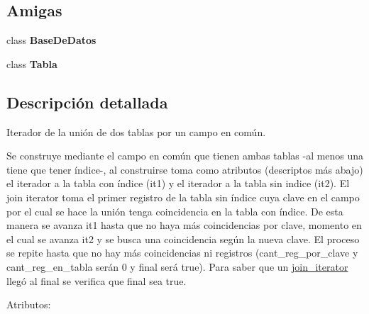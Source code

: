 \subsection*{Amigas}
\begin{DoxyCompactItemize}
\item 
\mbox{\label{classBaseDeDatos_1_1join__iterator_af1e840dbc460e53fa421d03b2da138e4}} 
class {\bfseries Base\+De\+Datos}
\item 
\mbox{\label{classBaseDeDatos_1_1join__iterator_a172484163cb8b80140c3053a4c68e4da}} 
class {\bfseries Tabla}
\end{DoxyCompactItemize}


\subsection{Descripción detallada}
Iterador de la unión de dos tablas por un campo en común. 

Se construye mediante el campo en común que tienen ambas tablas -\/al menos una tiene que tener índice-\/, al construirse toma como atributos (descriptos más abajo) el iterador a la tabla con índice (it1) y el iterador a la tabla sin indice (it2). El join iterator toma el primer registro de la tabla sin índice cuya clave en el campo por el cual se hace la unión tenga coincidencia en la tabla con índice. De esta manera se avanza it1 hasta que no haya más coincidencias por clave, momento en el cual se avanza it2 y se busca una coincidencia según la nueva clave. El proceso se repite hasta que no hay más coincidencias ni registros (cant\+\_\+reg\+\_\+por\+\_\+clave y cant\+\_\+reg\+\_\+en\+\_\+tabla serán 0 y final será true). Para saber que un \mbox{\hyperlink{classBaseDeDatos_1_1join__iterator}{join\+\_\+iterator}} llegó al final se verifica que final sea true.

Atributos\+:


